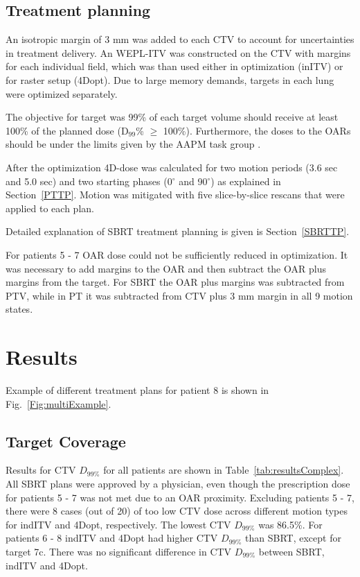 \subsection{Treatment planning}

An isotropic margin of 3 mm was added to each CTV to account for uncertainties in treatment delivery. An WEPL-ITV was constructed on the CTV with margins for each individual field, which was than used either in optimization (inITV)
or for raster setup (4Dopt). Due to large memory demands, targets in each lung were optimized separately. 
  
The objective for target was 99\% of each target volume should receive at least 100\% of the planned dose (D$_{99}$\% $\geq$ 100\%). Furthermore, the doses to the OARs should be under the limits given by the AAPM task group \cite{Benedict2010}. 
 
After the optimization 4D-dose was calculated for two motion periods (3.6 sec and 5.0 sec) and two starting phases (0$^\circ$ and 90$^\circ$) as explained in Section~\ref{PTTP}. Motion was mitigated with five 
slice-by-slice rescans that were applied to each plan.

Detailed explanation of SBRT treatment planning is given is Section~\ref{SBRTTP}.

For patients 5 - 7 OAR dose could not be sufficiently reduced in optimization. It was necessary to add margins to the OAR and then 
subtract the OAR plus margins from the target. For SBRT the OAR plus margins was subtracted from PTV, while in PT it was subtracted from CTV plus 3 mm margin in all 9 motion states.

\section{Results}

Example of different treatment plans for patient 8 is shown in Fig.~\ref{Fig:multiExample}.



\subsection{Target Coverage}

Results for CTV $D_{99\%}$ for all patients are shown in Table~\ref{tab:resultsComplex}. All SBRT plans were approved by a physician, 
even though the prescription dose for patients 5 - 7 was not met due to an OAR proximity. Excluding patients 5 - 7, there were 8 cases (out of 20) of too low CTV dose across different
motion types for indITV and 4Dopt, respectively. The lowest CTV $D_{99\%}$ was 86.5\%.
For patients 6 - 8 indITV and 4Dopt had higher CTV $D_{99\%}$ than SBRT, except for target 7c.
There was no significant difference in CTV $D_{99\%}$ between SBRT, indITV and 4Dopt.

